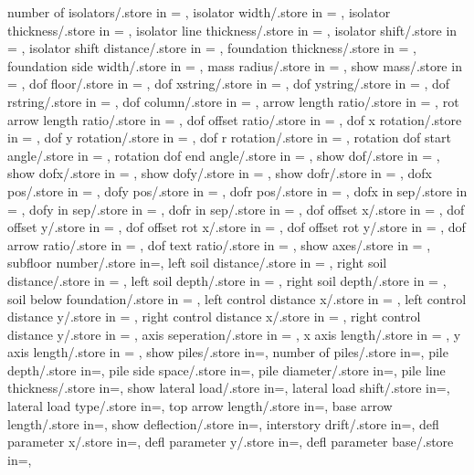 {  number of isolators/.store in = \numberofisolators,
  isolator width/.store in = \isolationwidth,
  isolator thickness/.store in = \isolationdepth,
  isolator line thickness/.store in = \isolinet,
  isolator shift/.store in = \isoshiftyn,
  isolator shift distance/.store in = \isoshift,
  foundation thickness/.store in = \foundationdepth,
  foundation side width/.store in = \foundsidew,
  mass radius/.store in = \massrad,
  show mass/.store in = \showmass,
  dof floor/.store in = \doflocfloor,
  dof xstring/.store in = \dofxstr,
  dof ystring/.store in = \dofystr,
  dof rstring/.store in = \dofrstr,
  dof column/.store in = \dofloccolumn,
  arrow length ratio/.store in = \arrowlenratio,
  rot arrow length ratio/.store in = \rotarrowlenratio,
  dof offset ratio/.store in = \dofoffsetratio,
  dof x rotation/.store in = \dofxrotation,
  dof y rotation/.store in = \dofyrotation,
  dof r rotation/.store in = \dofrrotation,
  rotation dof start angle/.store in = \rotdofstartangle,
  rotation dof end angle/.store in = \rotdofendangle,
  show dof/.store in = \showdof,
  show dofx/.store in = \shodofx,
  show dofy/.store in = \shodofy,
  show dofr/.store in = \shodofr,
  dofx pos/.store in = \dofposx,
  dofy pos/.store in = \dofposy,
  dofr pos/.store in = \dofposr,
  dofx in sep/.store in = \dofinnersepx,
  dofy in sep/.store in = \dofinnersepy,
  dofr in sep/.store in = \dofinnersepr,
  dof offset x/.store in = \dofoffsetx,
  dof offset y/.store in = \dofoffsety,
  dof offset rot x/.store in = \dofrotoffsetx,  
  dof offset rot y/.store in = \dofrotoffsety,
  dof arrow ratio/.store in = \dofarrowratio,
  dof text ratio/.store in = \doftextratio,
  show axes/.store in = \showaxes,
  subfloor number/.store in=\subfloors,
  left soil distance/.store in = \leftsoildist,
  right soil distance/.store in = \rightsoildist,
  left soil depth/.store in = \leftsoildepth,
  right soil depth/.store in = \rightsoildepth,
  soil below foundation/.store in = \soilbelowfound,
  left control distance x/.store in = \leftcontrolx,
  left control distance y/.store in = \leftcontroly,
  right control distance x/.store in = \rightcontrolx,
  right control distance y/.store in = \rightcontroly,
  axis seperation/.store in = \axisseperation,
  x axis length/.store in = \axeslenX,
  y axis length/.store in = \axeslenY,
  show piles/.store in=\showpiles,
  number of piles/.store in=\numberofpiles,
  pile depth/.store in=\piledepth,
  pile side space/.store in=\pilesidespace,
  pile diameter/.store in=\pilediameter,
  pile line thickness/.store in=\pilelinethickness,
  show lateral load/.store in=\showlatload,
  lateral load shift/.store in=\latloadshift,
  lateral load type/.store in=\latloadtype,
  top arrow length/.store in=\toparrlen,
  base arrow length/.store in=\basearrlen,
  show deflection/.store in=\showdefl, 
  interstory drift/.store in=\drift,
  defl parameter x/.store in=,
  defl parameter y/.store in=,
  defl parameter base/.store in=,}


